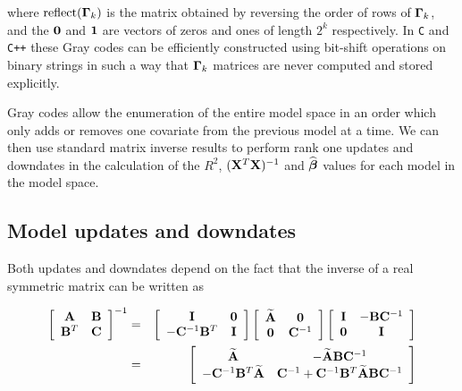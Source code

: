 {\noindent where $\mbox{reflect}({\boldsymbol \Gamma}_k)$ is the matrix obtained by reversing
the order of rows of ${\boldsymbol \Gamma}_k$, and the ${\bf 0}$ and ${\bf 1}$ are vectors of
zeros and ones of length $2^k$ respectively. In {\tt C} and {\tt C++} these
Gray codes can be efficiently constructed using bit-shift operations on binary
strings in such a way that ${\boldsymbol \Gamma}_{k}$ matrices are never computed and stored
explicitly.

Gray codes allow the enumeration of the entire model space in an order which
only adds or removes one covariate from the previous model at a time. We can
then use standard matrix inverse results to perform rank one updates and
downdates in the calculation of the $R^2$, $({\bf X}^T{\bf X})^{-1}$ and
$\widehat{{\boldsymbol \beta}}$ values for each model in the model space.

\subsection{Model updates and downdates} 

\noindent Both updates and downdates depend on the fact that the inverse of a
real symmetric matrix can be written as

\begin{eqnarray}
	\displaystyle \left[ \begin{array}{cc}
		{\bf A}   & {\bf B} \\
		{\bf B}^T & {\bf C}
	\end{array} \right]^{-1}
	&  = &
	\displaystyle \left[ \begin{array}{cc}
		{\bf I} & {\bf 0} \\
		-{\bf C}^{-1}{\bf B}^T &  {\bf I}
	\end{array} \right]
	\left[ \begin{array}{cc}
		\widetilde{{\bf A}} & {\bf 0} \\
		{\bf 0} & {\bf C}^{-1}
	\end{array} \right]
	\left[ \begin{array}{cc}
		{\bf I}    & -{\bf B}{\bf C}^{-1}\\
		{\bf 0} & {\bf I}
	\end{array} \right] \label{eq:blockdiag1}\\
	&  = &
	\displaystyle\left[
	\begin{array}{cc}
		\widetilde{{\bf A}}
		& - \widetilde{{\bf A}}{\bf B}{\bf C}^{-1} \\
		-{\bf C}^{-1}{\bf B}^T\widetilde{{\bf A}}
		& {\bf C}^{-1} + {\bf C}^{-1}{\bf B}^T\widetilde{{\bf A}}{\bf B}{\bf C}^{-1}
	\end{array}\right]\label{eq:blockdiag2}
\end{eqnarray}

}
